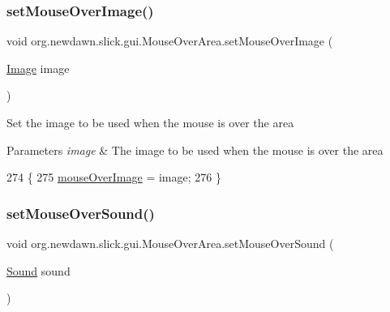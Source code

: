 \subsubsection{\texorpdfstring{set\+Mouse\+Over\+Image()}{setMouseOverImage()}}
{\footnotesize\ttfamily void org.\+newdawn.\+slick.\+gui.\+Mouse\+Over\+Area.\+set\+Mouse\+Over\+Image (\begin{DoxyParamCaption}\item[{\mbox{\hyperlink{classorg_1_1newdawn_1_1slick_1_1_image}{Image}}}]{image }\end{DoxyParamCaption})\hspace{0.3cm}{\ttfamily [inline]}}

Set the image to be used when the mouse is over the area


\begin{DoxyParams}{Parameters}
{\em image} & The image to be used when the mouse is over the area \\
\hline
\end{DoxyParams}

\begin{DoxyCode}
274                                                \{
275         \mbox{\hyperlink{classorg_1_1newdawn_1_1slick_1_1gui_1_1_mouse_over_area_ab3f31683b61b0184bc17e8b4925ca4cd}{mouseOverImage}} = image;
276     \}
\end{DoxyCode}
\mbox{\label{classorg_1_1newdawn_1_1slick_1_1gui_1_1_mouse_over_area_afdfa653a143d7502d4b368d094a0b24a}} 
\subsubsection{\texorpdfstring{set\+Mouse\+Over\+Sound()}{setMouseOverSound()}}
{\footnotesize\ttfamily void org.\+newdawn.\+slick.\+gui.\+Mouse\+Over\+Area.\+set\+Mouse\+Over\+Sound (\begin{DoxyParamCaption}\item[{\mbox{\hyperlink{classorg_1_1newdawn_1_1slick_1_1_sound}{Sound}}}]{sound }\end{DoxyParamCaption})\hspace{0.3cm}{\ttfamily [inline]}}


